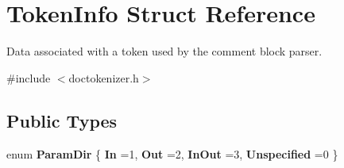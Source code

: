 \hypertarget{struct_token_info}{}\section{Token\+Info Struct Reference}
\label{struct_token_info}


Data associated with a token used by the comment block parser.  




{\ttfamily \#include $<$doctokenizer.\+h$>$}

\subsection*{Public Types}
\begin{DoxyCompactItemize}
\item 
\mbox{\label{struct_token_info_acc77be95dcb06cac9e3954a1ab62c443}} 
enum {\bfseries Param\+Dir} \{ {\bfseries In} =1, 
{\bfseries Out} =2, 
{\bfseries In\+Out} =3, 
{\bfseries Unspecified} =0
 \}
\end{DoxyCompactItemize}
